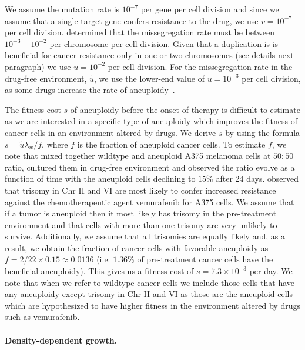 \documentclass[12pt]{extarticle}
\begin{document}
We assume the mutation rate is $10^{-7}$ per gene per cell division \citep{loeb2001mutator} and since we assume that a single target gene confers resistance to the drug, we use $v=10^{-7}$ per cell division. 
\citet{bakker2023predicting} determined that the missegregation rate must be between $10^{-3}-10^{-2}$ per chromosome per cell division. Given that a duplication is is beneficial for cancer resistance only in one or two chromosomes (see details next paragraph) we use $u=10^{-2}$ per cell division.
For the missegregation rate in the drug-free environment, $\tilde{u}$, we use the lower-end value of $\tilde{u}=10^{-3}$ per cell division, as some drugs increase the rate of aneuploidy~\citep{wang2019molecular,mason2017functional}.

The fitness cost $s$ of aneuploidy before the onset of therapy is difficult to estimate as we are interested in a specific type of aneuploidy which improves the fitness of cancer cells in an environment altered by drugs.
We derive $s$ by using the formula $s=\tilde{u}\lambda_w / f$, where $f$ is the fraction of aneuploid cancer cells. To estimate $f$, we note that \citet{lukow2021chromosomal} mixed together wildtype and aneuploid A375 melanoma cells at $50:50$ ratio, cultured them in drug-free environment and observed the ratio evolve as a function of time with the aneuploid cells declining to $15\%$ after 24 days. \citet{ippolito2021gene} observed that trisomy in Chr II and VI are most likely to confer increased resistance against the chemotherapeutic agent vemurafenib for A375 cells. We assume that if a tumor is aneuploid then it most likely has trisomy \citep{gisselsson2010generation} in the pre-treatment environment and that cells with more than one trisomy are very unlikely to survive. Additionally, we assume that all trisomies are equally likely and, as a result, we obtain the fraction of cancer cells with favorable aneuploidy as $f=2/22\times0.15\approx 0.0136$ (i.e. $1.36\%$ of pre-treatment cancer cells have the beneficial aneuploidy). This gives us a fitness cost of $s= 7.3\times10^{-3}$ per day.
We note that when we refer to wildtype cancer cells we include those cells that have any aneuploidy except trisomy in Chr II and VI as those are the aneuploid cells which are hypothesized to have higher fitness in the environment altered by drugs such as vemurafenib.

\paragraph{Density-dependent growth.}
\end{document}
